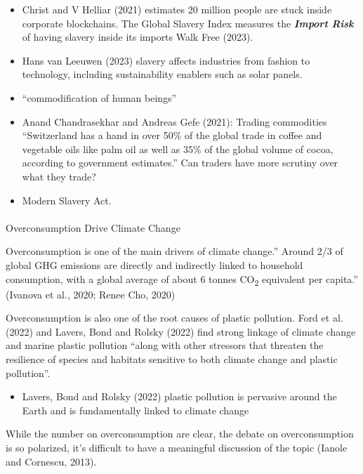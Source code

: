 \documentclass[
  letterpaper,
  DIV=11,
  numbers=noendperiod]{scrartcl}
\makeatletter
\let\oldparagraph\paragraph
\renewcommand{\paragraph}{
    \@ifstar
      \xxxParagraphStar
      \xxxParagraphNoStar
  }
\newcommand{\xxxParagraphStar}[1]{\oldparagraph*{#1}\mbox{}}
\newcommand{\xxxParagraphNoStar}[1]{\oldparagraph{#1}\mbox{}}
\providecommand{\tightlist}{%
  \setlength{\itemsep}{0pt}\setlength{\parskip}{0pt}}\usepackage{longtable,booktabs,array}
\makeatother
\begin{document}
\begin{itemize}
\item
  Christ and V Helliar (2021) estimates 20 million people are stuck
  inside corporate blockchains. The Global Slavery Index measures the
  \textbf{\emph{Import Risk}} of having slavery inside its imports Walk
  Free (2023).
\item
  Hans van Leeuwen (2023) slavery affects industries from fashion to
  technology, including sustainability enablers such as solar panels.
\item
  ``commodification of human beings''
\item
  Anand Chandrasekhar and Andreas Gefe (2021): Trading commodities
  ``Switzerland has a hand in over 50\% of the global trade in coffee
  and vegetable oils like palm oil as well as 35\% of the global volume
  of cocoa, according to government estimates.'' Can traders have more
  scrutiny over what they trade?
\item
  Modern Slavery Act.
\end{itemize}

\paragraph{Overconsumption Drive Climate
Change}\label{overconsumption-drive-climate-change}

Overconsumption is one of the main drivers of climate change.'' Around
2/3 of global GHG emissions are directly and indirectly linked to
household consumption, with a global average of about 6 tonnes
CO\textsubscript{2} equivalent per capita.'' (Ivanova et al., 2020;
Renee Cho, 2020)

Overconsumption is also one of the root causes of plastic pollution.
Ford et al. (2022) and Lavers, Bond and Rolsky (2022) find strong
linkage of climate change and marine plastic pollution ``along with
other stressors that threaten the resilience of species and habitats
sensitive to both climate change and plastic pollution''.

\begin{itemize}
\tightlist
\item
  Lavers, Bond and Rolsky (2022) plastic pollution is pervasive around
  the Earth and is fundamentally linked to climate change
\end{itemize}

While the number on overconsumption are clear, the debate on
overconsumption is so polarized, it's difficult to have a meaningful
discussion of the topic (Ianole and Cornescu, 2013).
\end{document}

